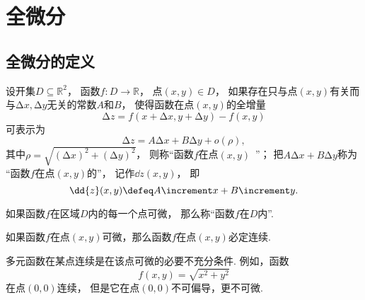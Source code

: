 \section{全微分}
\subsection{全微分的定义}
\begin{definition}
设开集\(D \subseteq \mathbb{R}^2\)，
函数\(f\colon D\to\mathbb{R}\)，
点\((x,y) \in D\)，
如果存在只与点\((x,y)\)有关而与\(\increment x,\increment y\)无关的常数\(A\)和\(B\)，
使得函数在点\((x,y)\)的全增量\begin{equation*}
	\increment z = f(x + \increment x,y + \increment y) - f(x,y)
\end{equation*}可表示为\begin{equation*}
	\increment z = A \increment x + B \increment y + o(\rho),
\end{equation*}
其中\(\rho=\sqrt{(\increment x)^2+(\increment y)^2}\)，
则称“函数\(f\)在点\((x,y)\)~”；
把\(A \increment x + B \increment y\)称为
“函数\(f\)在点\((x,y)\)的”，
记作\(\dd{z}(x,y)\)，
即\begin{equation*}
	\dd{z}(x,y)
	\defeq
	A \increment x + B \increment y.
\end{equation*}
\end{definition}
\begin{definition}
如果函数\(f\)在区域\(D\)内的每一个点可微，
那么称“函数\(f\)在\(D\)内”.
\end{definition}

\begin{theorem}[必要条件1]
如果函数\(f\)在点\((x,y)\)可微，那么函数\(f\)在点\((x,y)\)必定连续.
\end{theorem}
\begin{remark}
多元函数在某点连续是在该点可微的必要不充分条件.
例如，函数\begin{equation*}
	f(x,y) = \sqrt{x^2+y^2}
\end{equation*}在点\((0,0)\)连续，
但是它在点\((0,0)\)不可偏导，更不可微.
\end{remark}

